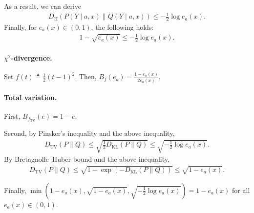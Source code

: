 As a result, we can derive 
\begin{align}
    D_{\mathrm{H}}(P(Y \mid a,x) \| Q(Y \mid a,x)) \leq -\frac{1}{2}\log e_a(x). 
\end{align}
Finally, for $e_a(x) \in (0,1)$, the following holds: 
\begin{align}
    1-\sqrt{e_a(x)} \leq -\frac{1}{2}\log e_a(x). 
\end{align}

\paragraph{$\chi^2$-divergence.}
Set $f(t) \triangleq \tfrac{1}{2}(t-1)^2$. Then, $B_f(e_a)  = \tfrac{1-e_a(x)}{2e_a(x)}$.

\paragraph{Total variation.}
First, $B_{f_\mathrm{TV}}(e) = 1-e$.

Second, by Pinsker's inequality and the above inequality, 
\begin{align}
    D_{\mathrm{TV}}(P \| Q) \leq \sqrt{\frac{1}{2}D_{\mathrm{KL}}(P \| Q)} \leq \sqrt{-\frac{1}{2}\log e_a(x)}. 
\end{align}
By Bretagnolle–Huber bound \citep{bretagnolle1979estimation} and the above inequality, 
\begin{align}
    D_{\mathrm{TV}}(P \| Q) \leq \sqrt{ 1-\exp(-D_{\mathrm{KL}}(P \| Q)) } \leq \sqrt{1-e_a(x)}.
\end{align}

Finally, $\min\left( 1-e_a(x), \sqrt{1-e_a(x)}, \sqrt{-\frac{1}{2}\log e_a(x)}\right) = 1-e_a(x)$ for all $e_a(x) \in (0,1)$.  

